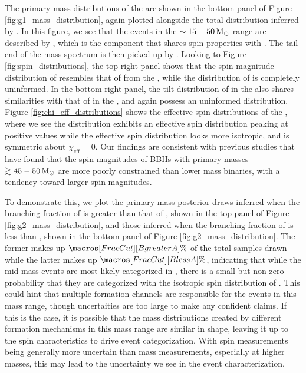 The primary mass distributions of the \comp{} are shown in the bottom panel of Figure \ref{fig:g1_mass_distribution}, again plotted alongside the total distribution inferred by \brucepaper{}. In this figure, we see that the events in the $\sim15-50 {\,\rm M}_\odot$ range are described by \contA{}, which is the component that shares spin properties with \first{}. The tail end of the mass spectrum is then picked up by \contB{}. Looking to Figure \ref{fig:spin_distributions}, the top right panel shows that the spin magnitude distribution of \popA{} resembles that of \popA{} from the \base{}, while the distribution of \popB{} is completely uninformed. In the bottom right panel, the tilt distribution of \popA{} in the \comp{} also shares similarities with that of \popA{} in the \base{}, and again \popB{} possess an uninformed distribution. Figure \ref{fig:chi_eff_distributions} shows the effective spin distributions of the \comp{}, where we see the \popA{} distribution exhibits an effective spin distribution peaking at positive values while the \popB{} effective spin distribution looks more isotropic, and is symmetric about $\chi_\mathrm{eff} = 0$. Our findings are consistent with previous studies \citep{2111.03634,2110.13542} that have found that the spin magnitudes of BBHs with primary masses $\gtrsim 45-50 {\,\rm M}_\odot$ are more poorly constrained than lower mass binaries, with a tendency toward larger spin magnitudes.


  To demonstrate this, we plot the primary mass posterior draws inferred when the branching fraction of \contA{} is greater than that of \contB{}, shown in the top panel of Figure \ref{fig:g2_mass_distribution}, and those inferred when the branching fraction of \contA{} is less than \contB{}, shown in the bottom panel of Figure \ref{fig:g2_mass_distribution}. The former makes up $\macros[FracCut][BgreaterA]\%$ of the total samples drawn while the latter makes up $\macros[FracCut][BlessA]\%$, indicating that while the mid-mass events are most likely categorized in \popA{}, there is a small but non-zero probability that they are categorized with the isotropic spin distribution of \popB{}. This could hint that multiple formation channels are responsible for the events in this mass range, though uncertaities are too large to make any confident claims. If this is the case, it is possible that the mass distributions created by different formation mechanisms in this mass range are similar in shape, leaving it up to the spin characteristics to drive event categorization. With spin measurements being generally more uncertain than mass measurements, especially at higher masses, this may lead to the uncertainty we see in the event characterization. 

